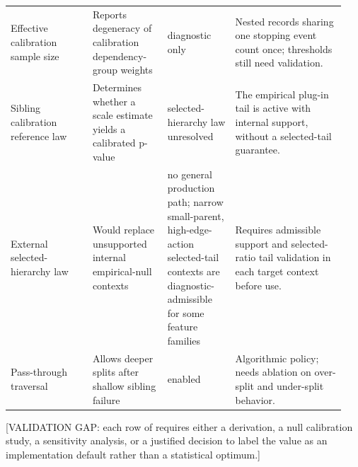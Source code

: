 \begin{longtable}{@{}>{\raggedright\arraybackslash}p{0.23\linewidth}>{\raggedright\arraybackslash}p{0.21\linewidth}>{\raggedright\arraybackslash}p{0.19\linewidth}>{\raggedright\arraybackslash}p{0.31\linewidth}@{}}
Effective calibration sample size & Reports degeneracy of calibration dependency-group weights & diagnostic only & Nested records sharing one stopping event count once; thresholds still need validation. \\
Sibling calibration reference law & Determines whether a scale estimate yields a calibrated p-value & selected-hierarchy law unresolved & The empirical plug-in tail is active with internal support, without a selected-tail guarantee. \\
External selected-hierarchy law & Would replace unsupported internal empirical-null contexts & no general production path; narrow small-parent, high-edge-action selected-tail contexts are diagnostic-admissible for some feature families & Requires admissible support and selected-ratio tail validation in each target context before use. \\
Pass-through traversal & Allows deeper splits after shallow sibling failure & enabled & Algorithmic policy; needs ablation on over-split and under-split behavior. \\
\bottomrule
\end{longtable}
\endgroup

[VALIDATION GAP: each row of  requires either a
derivation, a null calibration study, a sensitivity analysis, or a justified
decision to label the value as an implementation default rather than a
statistical optimum.]
